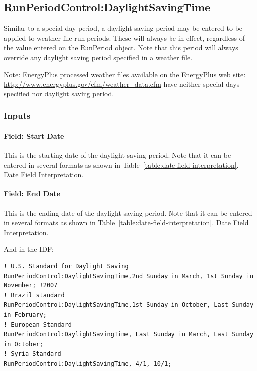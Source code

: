 \subsection{RunPeriodControl:DaylightSavingTime}\label{runperiodcontroldaylightsavingtime}

Similar to a special day period, a daylight saving period may be entered to be applied to weather file run periods. These will always be in effect, regardless of the value entered on the RunPeriod object. Note that this period will always override any daylight saving period specified in a weather file.

\begin{callout}
Note: EnergyPlus processed weather files available on the EnergyPlus web site: \url{http://www.energyplus.gov/cfm/weather\_data.cfm} have neither special days specified nor daylight saving period.

\end{callout}

\subsubsection{Inputs}\label{inputs-7-013}

\paragraph{Field: Start Date}\label{field-start-date-1}

This is the starting date of the daylight saving period. Note that it can be entered in several formats as shown in Table~\ref{table:date-field-interpretation}. Date Field Interpretation.

\paragraph{Field: End Date}\label{field-end-date}

This is the ending date of the daylight saving period. Note that it can be entered in several formats as shown in Table~\ref{table:date-field-interpretation}. Date Field Interpretation.

And in the IDF:

\begin{lstlisting}
! U.S. Standard for Daylight Saving
RunPeriodControl:DaylightSavingTime,2nd Sunday in March, 1st Sunday in November; !2007
! Brazil standard
RunPeriodControl:DaylightSavingTime,1st Sunday in October, Last Sunday in February;
! European Standard
RunPeriodControl:DaylightSavingTime, Last Sunday in March, Last Sunday in October;
! Syria Standard
RunPeriodControl:DaylightSavingTime, 4/1, 10/1;
\end{lstlisting}

